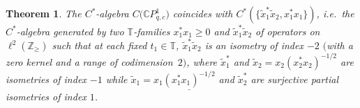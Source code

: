 \documentclass[11pt]{article}
\numberwithin{equation}{section}
\newtheorem{theorem}{Theorem}
\begin{document}
\begin{theorem}\label{generators} The $C^*$-algebra $C\big(\mathbb{C}P_{q,c}^{1}\big)$ coincides with $C^{\ast} (
 \{ \tilde{x}_{1}^{\ast}\tilde{x}_{2},x_{1}^{\ast}x_{1} \} )
$, i.e.\ the $C^*$-algebra generated by two $\mathbb{T}$-families $x_{1}^{\ast}x_{1}\geq0$ and
$\tilde{x}_{1}^{\ast}\tilde{x}_{2}$ of operators on $\ell^{2} (
\mathbb{Z}_{\geq} ) $ such that at each fixed $t_{1}\mathbb{\in
}\mathbb{T}$, $\tilde{x}_{1}^{\ast}\tilde{x}_{2}$ is an isometry of index $-2$
$($with a zero kernel and a range of codimension~$2)$, where $\tilde{x}%
_{1}^{\ast}$ and $\tilde{x}_{2}=x_{2} ( x_{2}^{\ast}x_{2} )
^{-1/2}$ are isometries of index $-1$ while $\tilde{x}_{1}=x_{1}%
\underline{ ( x_{1}^{\ast}x_{1} ) ^{-1/2}}$ and $\tilde{x}%
_{2}^{\ast}$ are surjective partial isometries of index $1$.
\end{theorem}
\end{document}
